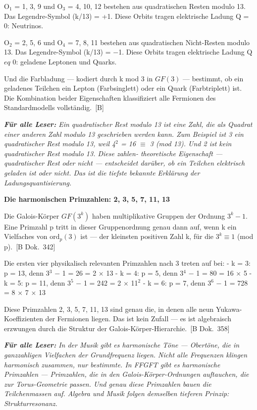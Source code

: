 \documentclass[11pt,oneside]{book}
\newcommand{\status}[1]{\penalty10000\,{\scriptsize\textcolor{gray!60}{[#1]}}}
\newenvironment{laierspur}{%
  \par\vspace{4pt}%
  \noindent\small\itshape\color{blue!60!black}%
  \textbf{Für alle Leser:}\enspace\ignorespaces}{%
  \par\vspace{4pt}\normalsize\normalfont\normalcolor}
\begin{document}
O$_1$ = {1, 3, 9} und O$_3$ = {4, 10, 12} bestehen aus quadratischen Resten
modulo 13. Das Legendre-Symbol (k/13) = +1. Diese Orbits tragen elektrische
Ladung Q = 0: Neutrinos.


O$_2$ = {2, 5, 6} und O$_4$ = {7, 8, 11} bestehen aus quadratischen Nicht-Resten
modulo 13. Das Legendre-Symbol (k/13) = $-$1. Diese Orbits tragen elektrische
Ladung Q $
eq$ 0: geladene Leptonen und Quarks.


Und die Farbladung — kodiert durch k mod 3 in $GF(3)$ — bestimmt, ob ein
geladenes Teilchen ein Lepton (Farbsinglett) oder ein Quark (Farbtriplett)
ist. Die Kombination beider Eigenschaften klassifiziert alle Fermionen des
Standardmodells vollständig. \status{B}


\begin{laierspur}
Ein quadratischer Rest modulo 13 ist eine Zahl, die als
Quadrat einer anderen Zahl modulo 13 geschrieben werden kann. Zum
Beispiel ist 3 ein quadratischer Rest modulo 13, weil 4$^2$ = 16 $\equiv$ 3
(mod 13). Und 2 ist kein quadratischer Rest modulo 13. Diese zahlen-
theoretische Eigenschaft — quadratischer Rest oder nicht — entscheidet
darüber, ob ein Teilchen elektrisch geladen ist oder nicht. Das ist die
tiefste bekannte Erklärung der Ladungsquantisierung.
\end{laierspur}

\textbf{Die harmonischen Primzahlen: {2, 3, 5, 7, 11, 13}}


Die Galois-Körper $GF(3^k)$ haben multiplikative Gruppen der Ordnung $3^k - 1$.
Eine Primzahl p tritt in dieser Gruppenordnung genau dann auf, wenn k ein
Vielfaches von $\text{ord}_p(3)$ ist — der kleinsten positiven Zahl k, für die
$3^k \equiv 1$ (mod p). \status{B Dok.~342}


Die ersten vier physikalisch relevanten Primzahlen nach 3 treten auf bei:
- k = 3: p = 13, denn 3$^3$ $-$ 1 = 26 = 2 $\times$ 13
- k = 4: p = 5, denn 3$^4$ $-$ 1 = 80 = 16 $\times$ 5
- k = 5: p = 11, denn 3$^5$ $-$ 1 = 242 = 2 $\times$ 11$^2$
- k = 6: p = 7, denn 3$^6$ $-$ 1 = 728 = 8 $\times$ 7 $\times$ 13


Diese Primzahlen {2, 3, 5, 7, 11, 13} sind genau die, in denen alle
neun Yukawa-Koeffizienten der Fermionen liegen. Das ist kein Zufall — es
ist algebraisch erzwungen durch die Struktur der Galois-Körper-Hierarchie.
\status{B Dok.~358}


\begin{laierspur}
In der Musik gibt es harmonische Töne — Obertöne, die in
ganzzahligen Vielfachen der Grundfrequenz liegen. Nicht alle Frequenzen
klingen harmonisch zusammen, nur bestimmte. In FFGFT gibt es harmonische
Primzahlen — Primzahlen, die in den Galois-Körper-Ordnungen auftauchen,
die zur Torus-Geometrie passen. Und genau diese Primzahlen bauen die
Teilchenmassen auf. Algebra und Musik folgen demselben tieferen Prinzip:
Strukturresonanz.
\end{laierspur}
\end{document}
